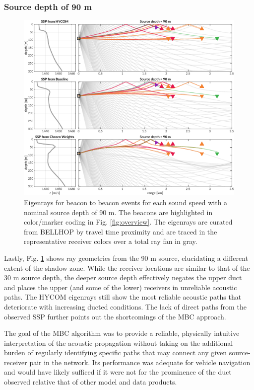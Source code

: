 \subsubsection{Source depth of 90 m}
\begin{figure}[ht!]
  \centering
  \includegraphics[width=\reprintcolumnwidth]{figs/raytrace-3env-zs-90.pdf}
  \caption{Eigenrays for beacon to beacon events for each sound speed with a nominal source depth of 90 m. The beacons are highlighted in color/marker coding in Fig. \ref{fig:overview}. The eigenrays are curated from BELLHOP by travel time proximity and are traced in the representative receiver colors over a total ray fan in gray.}
  \label{fig:raytrace-zs90}
\end{figure}

Lastly, Fig. \ref{fig:raytrace-zs90} shows ray geometries from the 90 m source, elucidating a different extent of the shadow zone. 
While the receiver locations are similar to that of the 30 m source depth, the deeper source depth effectively negates the upper duct and places the upper (and some of the lower) receivers in unreliable acoustic paths.
The HYCOM eigenrays still show the most reliable acoustic paths that deteriorate with increasing ducted conditions.
The lack of direct paths from the observed SSP further points out the shortcomings of the MBC approach.

The goal of the MBC algorithm was to provide a reliable, physically intuitive interpretation of the acoustic propagation without taking on the additional burden of regularly identifying specific paths that may connect any given source-receiver pair in the network.
Its performance was adequate for vehicle navigation and would have likely sufficed if it were not for the prominence of the duct observed relative that of other model and data products. 

